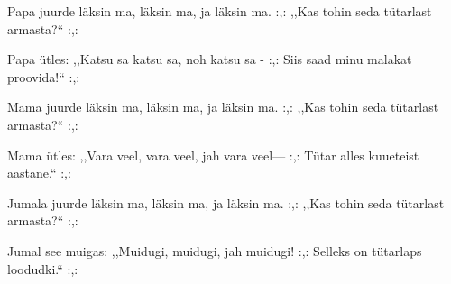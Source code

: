 Papa juurde l\"aksin ma,
l\"aksin ma, ja l\"aksin ma.
:,: ,,Kas tohin seda t\"utarlast armasta?{``} :,: 

Papa \"utles: ,,Katsu sa
katsu sa, noh katsu sa -
:,: Siis saad minu malakat proovida!{``} :,: 

Mama juurde l\"aksin ma,
l\"aksin ma, ja l\"aksin ma.
:,: ,,Kas tohin seda t\"utarlast armasta?{``} :,: 

Mama \"utles: ,,Vara veel,
vara veel, jah vara veel---
:,: T\"utar alles kuueteist aastane.{``} :,: 

Jumala juurde l\"aksin ma,
l\"aksin ma, ja l\"aksin ma.
:,: ,,Kas tohin seda t\"utarlast armasta?{``} :,: 

Jumal see muigas: ,,Muidugi,
muidugi, jah muidugi!
:,: Selleks on t\"utarlaps loodudki.{``} :,: 
